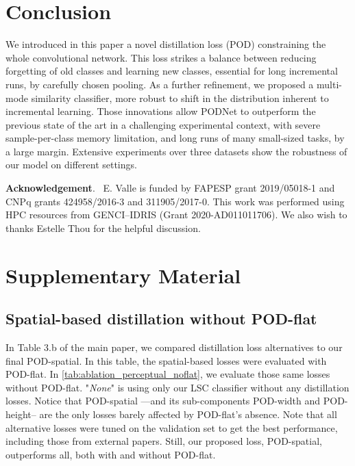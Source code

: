 \documentclass[runningheads]{llncs}
\newcommand{\parag}[1]{\vspace{0.2cm}\noindent\textbf{#1}.\ }
\begin{document}
\section{Conclusion}

We introduced in this paper a novel distillation loss (POD) constraining the whole convolutional network. This loss strikes a balance between reducing forgetting of old classes and learning new classes, essential for long incremental runs, by carefully chosen pooling. As a further refinement, we proposed a multi-mode similarity classifier, more robust to shift in the distribution inherent to incremental learning.
Those innovations allow PODNet to outperform the previous state of the art in a challenging experimental context, with severe sample-per-class memory limitation, and long runs of many small-sized tasks, by a large margin. Extensive experiments over three datasets show the robustness of our model on different settings.

\parag{Acknowledgement} E. Valle is funded by FAPESP grant 2019/05018-1 and CNPq grants 424958/2016-3 and 311905/2017-0. This work was performed using HPC resources from GENCI–IDRIS (Grant 2020-AD011011706). We also wish to thanks Estelle Thou for the helpful discussion.
 


\section{Supplementary Material}

\subsection{Spatial-based distillation without POD-flat}

In Table 3.b of the main paper, we compared  distillation loss alternatives to our final POD-spatial. In this table, the spatial-based losses were evaluated with POD-flat. In \autoref{tab:ablation_perceptual_noflat}, we evaluate those same losses without POD-flat. "\textit{None}" is using only our LSC classifier without any distillation losses. Notice that POD-spatial ---and its sub-components POD-width and POD-height-- are the only losses barely affected by POD-flat's absence. Note that all alternative losses were tuned on the validation set to get the best performance, including those from external papers. Still, our proposed loss, POD-spatial, outperforms all, both with and without POD-flat.
\end{document}
